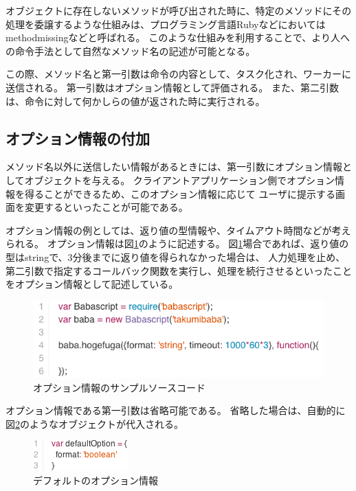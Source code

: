 オブジェクトに存在しないメソッドが呼び出された時に、特定のメソッドにその処理を委譲するような仕組みは、プログラミング言語Rubyなどにおいては
methodmissingなどと呼ばれる。
このような仕組みを利用することで、より人への命令手法として自然なメソッド名の記述が可能となる。

この際、メソッド名と第一引数は命令の内容として、タスク化され、ワーカーに送信される。
第一引数はオプション情報として評価される。
また、第二引数は、命令に対して何かしらの値が返された時に実行される。

\subsection{オプション情報の付加}

メソッド名以外に送信したい情報があるときには、第一引数にオプション情報としてオブジェクトを与える。
クライアントアプリケーション側でオプション情報を得ることができるため、このオプション情報に応じて
ユーザに提示する画面を変更するといったことが可能である。

オプション情報の例としては、返り値の型情報や、タイムアウト時間などが考えられる。
オプション情報は図\ref{fig:babascript_option}のように記述する。
図\ref{fig:babascript_option}場合であれば、返り値の型はstringで、3分後までに返り値を得られなかった場合は、
人力処理を止め、第二引数で指定するコールバック関数を実行し、処理を続行させるといったことをオプション情報として記述している。

\begin{figure}[htbp]
  \begin{center}
  \includegraphics[width=.7\linewidth,bb=0 0 378 160]{images/babascript_option_sample.js.png}
  \end{center}
  \caption{オプション情報のサンプルソースコード}
  \label{fig:babascript_option}
\end{figure}

オプション情報である第一引数は省略可能である。
省略した場合は、自動的に図\ref{fig:option_default}のようなオブジェクトが代入される。

\begin{figure}[htbp]
  \begin{center}
  \includegraphics[width=.3\linewidth,bb=0 0 138 44]{images/option_default.js.png}
  \end{center}
  \caption{デフォルトのオプション情報}
  \label{fig:option_default}
\end{figure}


